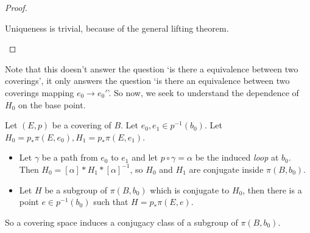 \begin{proof}
\begin{itemize}
            Uniqueness is trivial, because of the general lifting theorem.
    \end{itemize}
\end{proof}

Note that this doesn't answer the question `is there a equivalence between two coverings', it only answers the question `is there an equivalence between two coverings mapping $e_0 \to  e_0'$'.
So now, we seek to understand the dependence of $H_0$ on the base point.

\begin{lemma}
    Let $(E, p)$ be a covering of $B$.
    Let $e_0, e_1 \in p^{-1}(b_0)$.
    Let $H_0 = p_* \pi(E,e_0), H_1 = p_* \pi(E,e_1)$.
    \begin{itemize}
        \item Let $\gamma$ be a path from $e_0$ to $e_1$ and let $p  \circ  \gamma = \alpha$ be the induced \emph{loop} at $b_0.$ 
        Then $H_0 = [\alpha] * H_1 * [\alpha]^{-1}$, so $H_0$ and $H_1$ are conjugate inside $\pi(B,b_0)$.
        \item Let $H$ be a subgroup of $\pi(B,b_0)$ which is conjugate to $H_0$, then there is a point $e \in p^{-1}(b_0)$ such that $H = p_* \pi(E, e)$.
    \end{itemize}

    So a covering space induces a conjugacy class of a subgroup of $\pi(B,b_0)$.
\end{lemma}
